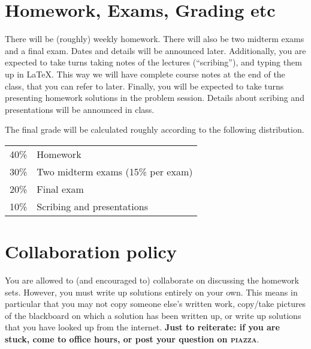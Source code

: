 \documentclass[letterpaper,10pt]{amsart}
\newcommand{\resource}{\textsc}
\begin{document}
\section{Homework, Exams, Grading etc}
There will be (roughly) weekly homework.
There will also be two midterm exams and a final exam.
Dates and details will be announced later.
Additionally, you are expected to take turns taking notes of the lectures (``scribing''), and typing them up in \LaTeX.
This way we will have complete course notes at the end of the class, that you can refer to later.
Finally, you will be expected to take turns presenting homework solutions in the problem session.
Details about scribing and presentations will be announced in class.

The final grade will be calculated roughly according to the following distribution.
\begin{center}
  \begin{tabular}[t]{rl}
    40\%  & Homework\\
    30\%  & Two midterm exams (15\% per exam) \\
    20\%  & Final exam \\
    10\%  & Scribing and presentations \\
  \end{tabular}
\end{center}

\section{Collaboration policy}
You are allowed to (and encouraged to) collaborate on discussing the homework sets.
However, you must write up solutions entirely on your own.
This means in particular that you may not copy someone else's written work, copy/take pictures of the blackboard on which a solution has been written up, or write up solutions that you have looked up from the internet.
\textbf{Just to reiterate: if you are stuck, come to office hours, or post your question on \resource{piazza}}.
\end{document}
